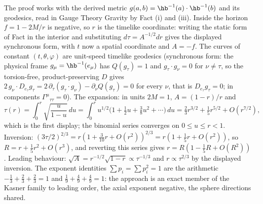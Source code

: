 The proof works with the derived metric $g(a,b) = \hb^{-1}(a) \cdot \hb^{-1}(b)$ and its geodesics, read in Gauge Theory Gravity by Fact (i) and (iii). Inside the horizon $f = 1 - 2M/r$ is negative, so $r$ is the timelike coordinate: writing the static form of Fact  in the interior and substituting $d\tau = A^{-1/2}dr$ gives the displayed synchronous form, with $t$ now a spatial coordinate and $A = -f$. The curves of constant $(t,\theta,\varphi)$ are unit-speed timelike geodesics (synchronous form: the physical frame $g_\mu = \hb^{-1}(e_\mu)$ has $Q(g_\tau) = 1$ and $g_\tau \cdot g_\nu = 0$ for $\nu \neq \tau$, so the torsion-free, product-preserving $D$ gives $2\,g_\nu \cdot D_{e_\tau} g_\tau = 2\,\partial_\tau(g_\tau \cdot g_\nu) - \partial_\nu Q(g_\tau) = 0$ for every $\nu$, that is $D_{e_\tau} g_\tau = 0$; in components $\Gamma^\mu{}_{\tau\tau} = 0$). The expansion: in units $2M = 1$, $A = (1-r)/r$ and
\[
\tau(r) = \int_0^r \sqrt{\frac{u}{1-u}}\,du
= \int_0^r u^{1/2}\bigl(1 + \tfrac12 u + \tfrac38 u^2 + \cdots\bigr)\,du
= \tfrac23 r^{3/2} + \tfrac15 r^{5/2} + O(r^{7/2}),
\]
which is the first display; the binomial series converges on $0 \le u \le r < 1$. Inversion: $(3\tau/2)^{2/3} = r(1 + \tfrac{3}{10}r + O(r^2))^{2/3} = r(1 + \tfrac15 r + O(r^2))$, so $R = r + \tfrac15 r^2 + O(r^3)$, and reverting this series gives $r = R(1 - \tfrac15 R + O(R^2))$. Leading behaviour: $\sqrt A = r^{-1/2}\sqrt{1-r} \propto \tau^{-1/3}$ and $r \propto \tau^{2/3}$ by the displayed inversion. The exponent identities $\sum p_i = \sum p_i^2 = 1$ are the arithmetic $-\tfrac13 + \tfrac23 + \tfrac23 = 1$ and $\tfrac19 + \tfrac49 + \tfrac49 = 1$: the approach is an exact member of the Kasner family to leading order, the axial exponent negative, the sphere directions shared.
